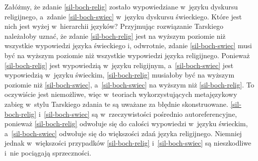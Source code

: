 Załóżmy, że zdanie \ref{sil-boch-relig} zostało wypowiedziane w~języku dyskursu religijnego, a~zdanie \ref{sil-boch-swiec} w~języku dyskursu świeckiego. Które jest nich jest wyżej w~hierarchii języków? Przyjmując rozwiązanie Tarskiego należałoby uznać, że zdanie \ref{sil-boch-relig} jest na wyższym poziomie niż wszystkie wypowiedzi języka świeckiego i, odwrotnie, zdanie \ref{sil-boch-swiec} musi być na wyższym poziomie niż wszystkie wypowiedzi języka religijnego. Ponieważ \ref{sil-boch-relig} jest wypowiedzią w~języku religijnym, a~\ref{sil-boch-swiec} jest wypowiedzią w~języku świeckim, \ref{sil-boch-relig} musiałoby być na wyższym poziomie niż \ref{sil-boch-swiec}, a~\ref{sil-boch-swiec} na wyższym niż \ref{sil-boch-relig}. To oczywiście jest niemożliwe, więc w~teoriach wykorzystujących metajęzykowy zabieg w~stylu Tarskiego zdania te są uważane za błędnie skonstruowane. \ref{sil-boch-relig} i~\ref{sil-boch-swiec} są w~rzeczywistości pośrednio autoreferencyjne, ponieważ \ref{sil-boch-relig} odwołuje się do całości wypowiedzi w~języku świeckim,
a~\ref{sil-boch-swiec} odwołuje się do większości zdań języka religijnego.
Niemniej jednak w~większości przypadków \ref{sil-boch-relig} i~\ref{sil-boch-swiec} są nieszkodliwe i~nie pociągają sprzeczności.

